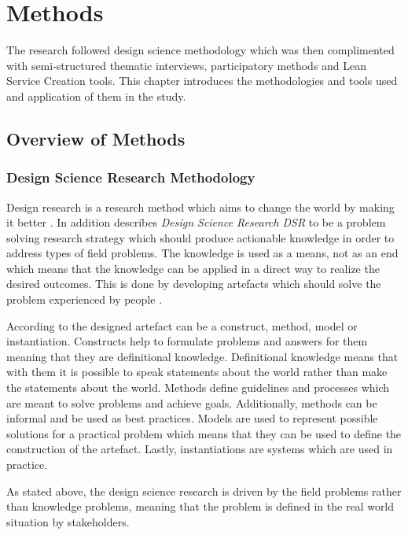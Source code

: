 \chapter{Methods}
\label{chapter:methods}

The research followed design science methodology which was then complimented with semi-structured thematic interviews, participatory methods and Lean Service Creation tools. This chapter introduces the methodologies and tools used and application of them in the study.

\section{Overview of Methods}
\label{section:overview}

\subsection{Design Science Research Methodology}

Design research is a research method which aims to change the world by making it better \parencite{Johannesson:2014}. In addition \textcite{Aken:2014} describes \emph{Design Science Research DSR} to be a problem solving research strategy which should produce actionable knowledge in order to address types of field problems. The knowledge is used as a means, not as an end which means that the knowledge can be applied in a direct way to realize the desired outcomes. This is done by developing artefacts which should solve the problem experienced by people \parencite{Johannesson:2014}.

According to \textcite{Johannesson:2014} the designed artefact can be a construct, method, model or instantiation. Constructs help to formulate problems and answers for them meaning that they are definitional knowledge. Definitional knowledge means that with them it is possible to speak statements about the world rather than make the statements about the world. Methods define guidelines and processes which are meant to solve problems and achieve goals. Additionally, methods can be informal and be used as best practices. Models are used to represent possible solutions for a practical problem which means that they can be used to define the construction of the artefact. Lastly, instantiations are systems which are used in practice.

As stated above, the design science research is driven by the field problems rather than knowledge problems, meaning that the problem is defined in the real world situation by stakeholders. 

